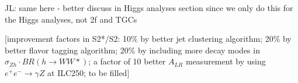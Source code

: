 {\color{red} JL: same here - better discuss in Higgs analyses section since we only do this for the Higgs analyses, not 2f and TGCs}

[improvement factors in S2*/S2: 10\% by better jet clustering algorithm; 
20\% by better flavor tagging algorithm; 20\% by 
including more decay modes in $\sigma_{Zh}\cdot BR(h\to WW*)$; a factor of 10 better $A_{LR}$
measurement by using $e^+e^-\to\gamma Z$ at ILC250; to be filled]
